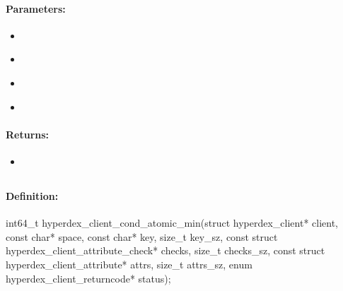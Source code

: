 \paragraph{Parameters:}
\begin{itemize}[noitemsep]
\item {}\\

\item {}\\

\item {}\\

\item {}\\

\end{itemize}

\paragraph{Returns:}
\begin{itemize}[noitemsep]
\item {}\\

\end{itemize}

\pagebreak
\subsection{}
\label{api:c:cond_atomic_min}


\paragraph{Definition:}
\begin{ccode}
int64_t hyperdex_client_cond_atomic_min(struct hyperdex_client* client,
        const char* space,
        const char* key, size_t key_sz,
        const struct hyperdex_client_attribute_check* checks, size_t checks_sz,
        const struct hyperdex_client_attribute* attrs, size_t attrs_sz,
        enum hyperdex_client_returncode* status);
\end{ccode}

